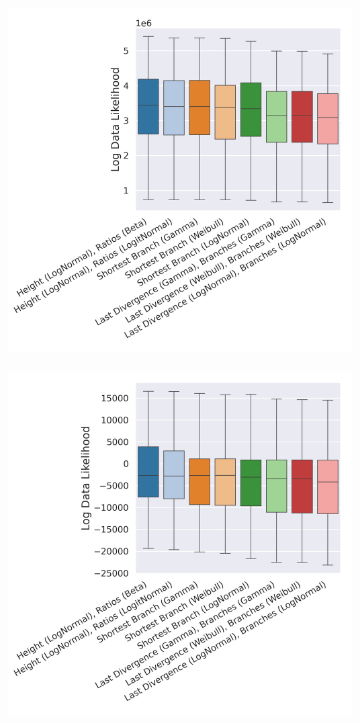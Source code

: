 \documentclass[10pt,letterpaper]{article}
\begin{document}
\begin{figure}
	\begin{subfigure}[b]{0.45\textwidth}
		\centering
		\includegraphics[width=\textwidth]{figures/yule-400-ccd1-likelihood.png}
	\end{subfigure}
	\begin{subfigure}[b]{0.45\textwidth}
		\centering
		\includegraphics[width=\textwidth]{figures/bio-ccd1-likelihood.png}
	\end{subfigure}
	
	\label{fig:data-likelihood}
\end{figure}
\end{document}
